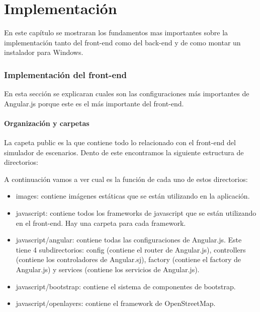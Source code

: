\chapter{Implementación}

En este capítulo se mostraran los fundamentos mas importantes sobre la implementación tanto del front-end como del back-end y de como montar un instalador para Windows.

\subsection{Implementación del front-end}

En esta sección se explicaran cuales son las configuraciones más importantes de Angular.js porque este es el más importante del front-end. 

\subsubsection{Organización y carpetas}

La capeta public es la que contiene todo lo relacionado con el front-end del simulador de escenarios. Dento de este encontramos la siguiente estructura de directorios: 


A continuación vamos a ver cual es la función de cada uno de estos directorios:
\begin{itemize}
	\item images: contiene imágenes estáticas que se están utilizando en la aplicación.
	\item javascript: contiene todos los frameworks de javascript que se están utilizando en el front-end. Hay una carpeta para cada framework.
	\item javascript/angular: contiene todas las configuraciones de Angular.js. Este tiene 4 subdirectorios: config (contiene el router de Angular.js), controllers (contiene los controladores de Angular.sj), factory (contiene el factory de Angular.js) y services (contiene los servicios de Angular.js).
	\item javascript/bootstrap: contiene el sistema de componentes de bootstrap.
	\item javascript/openlayers: contiene el framework de OpenStreetMap.
\end{itemize}

